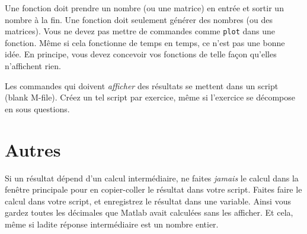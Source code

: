 Une fonction doit prendre un nombre (ou une matrice) en entrée et sortir un nombre à la fin. Une fonction doit seulement générer des nombres (ou des matrices). Vous ne devez pas mettre de commandes comme \verb+plot+ dans une fonction. Même si cela fonctionne de temps en temps, ce n'est pas une bonne idée. En principe, vous devez concevoir vos fonctions de telle façon qu'elles n'affichent rien.

Les commandes qui doivent \emph{afficher} des résultats se mettent dans un script (blank M-file). Créez un tel script par exercice, même si l'exercice se décompose en sous questions.

\section{Autres}

Si un résultat dépend d'un calcul intermédiaire, ne faites \emph{jamais} le calcul dans la fenêtre principale pour en copier-coller le résultat dans votre script. Faites faire le calcul dans votre script, et enregistrez le résultat dans une variable. Ainsi vous gardez toutes les décimales que Matlab avait calculées sans les afficher. Et cela, même si ladite réponse intermédiaire est un nombre entier.


